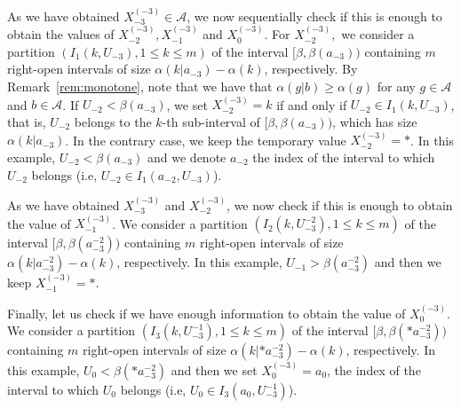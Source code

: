 \documentclass[a4paper]{article}
\newcommand{\A}{\mathcal{A}}
\begin{document}
As we have obtained $X^{(-3)}_{-3} \in \A$, we now sequentially check if this is enough to obtain the values of $X^{(-3)}_{-2},X^{(-3)}_{-1}$ and $X^{(-3)}_{0}$. 
For $X^{(-3)}_{-2},$ we consider a partition $ (I_1 (k, U_{-3}), 1 \le k \le m )$ of the interval $[\beta, \beta( a_{-3}))$ containing $m$ right-open intervals of size $\alpha(k|a_{-3})-\alpha(k)$, respectively.
By Remark~\ref{rem:monotone}, note that we have that $\alpha(g|b)\geq \alpha(g)$ for any $g\in \A$ and $b\in\A$. If $U_{-2}<\beta(a_{-3})$, we set $X^{(-3)}_{-2}=k$ if and only if $U_{-2} \in I_1 (k, U_{-3})$, that is, $U_{-2}$ belongs to the $k$-th sub-interval of $[\beta, \beta( a_{-3}))$, which has size $\alpha(k|a_{-3})$. In the contrary case, we keep the temporary value $X^{(-3)}_{-2}=*$. In this example, $U_{-2}<\beta(a_{-3})$ and we denote $a_{-2}$ the index of
the interval to which $U_{-2}$ belongs (i.e, $U_{-2}\in I_1 (a_{-2}, U_{-3})$). 

As we have obtained $X^{(-3)}_{-3}$ and $X^{(-3)}_{-2}$, we now  check if this is enough to obtain the value of $X^{(-3)}_{-1}$. We consider a partition $ (I_2 (k, U_{-3}^{-2}), 1 \le k \le m )$ of the interval $[\beta, \beta( a_{-3}^{-2}))$ containing $m$ right-open intervals of size $\alpha(k|a_{-3}^{-2})-\alpha(k)$, respectively.
In this example, $U_{-1}>\beta(a_{-3}^{-2})$ and then we keep $X^{(-3)}_{-1}=*$.

Finally, let us check if we have enough information to obtain the value of $X^{(-3)}_{0}$. 
We consider a partition $ (I_3 (k, U_{-3}^{-1}), 1 \le k \le m )$ of the interval $[\beta, \beta(* a_{-3}^{-2}))$ containing $m$ right-open intervals of size $\alpha(k|*a_{-3}^{-2})-\alpha(k)$, respectively.
In this example, $U_{0}<\beta(*a_{-3}^{-2})$ and then we set $X^{(-3)}_{0}=a_0$, the index of the interval to which $U_{0}$ belongs (i.e, $U_{0}\in I_3 (a_{0}, U_{-3}^{-1})$).
\end{document}
